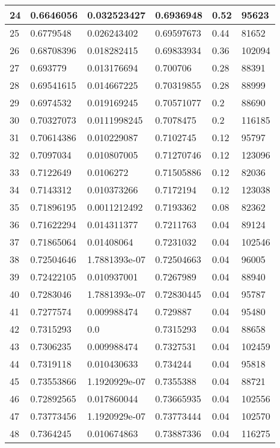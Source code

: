 \begin{longtable}{|l|l|l|l|l|l|}
24 & 0.6646056 & 0.032523427 & 0.6936948 & 0.52 & 95623 \\ \hline 
25 & 0.6779548 & 0.026243402 & 0.69597673 & 0.44 & 81652 \\ \hline 
26 & 0.68708396 & 0.018282415 & 0.69833934 & 0.36 & 102094 \\ \hline 
27 & 0.693779 & 0.013176694 & 0.700706 & 0.28 & 88391 \\ \hline 
28 & 0.69541615 & 0.014667225 & 0.70319855 & 0.28 & 88999 \\ \hline 
29 & 0.6974532 & 0.019169245 & 0.70571077 & 0.2 & 88690 \\ \hline 
30 & 0.70327073 & 0.0111998245 & 0.7078475 & 0.2 & 116185 \\ \hline 
31 & 0.70614386 & 0.010229087 & 0.7102745 & 0.12 & 95797 \\ \hline 
32 & 0.7097034 & 0.010807005 & 0.71270746 & 0.12 & 123096 \\ \hline 
33 & 0.7122649 & 0.0106272 & 0.71505886 & 0.12 & 82036 \\ \hline 
34 & 0.7143312 & 0.010373266 & 0.7172194 & 0.12 & 123038 \\ \hline 
35 & 0.71896195 & 0.0011212492 & 0.7193362 & 0.08 & 82362 \\ \hline 
36 & 0.71622294 & 0.014311377 & 0.7211763 & 0.04 & 89124 \\ \hline 
37 & 0.71865064 & 0.01408064 & 0.7231032 & 0.04 & 102546 \\ \hline 
38 & 0.72504646 & 1.7881393e-07 & 0.72504663 & 0.04 & 96005 \\ \hline 
39 & 0.72422105 & 0.010937001 & 0.7267989 & 0.04 & 88940 \\ \hline 
40 & 0.7283046 & 1.7881393e-07 & 0.72830445 & 0.04 & 95787 \\ \hline 
41 & 0.7277574 & 0.009988474 & 0.729887 & 0.04 & 95480 \\ \hline 
42 & 0.7315293 & 0.0 & 0.7315293 & 0.04 & 88658 \\ \hline 
43 & 0.7306235 & 0.009988474 & 0.7327531 & 0.04 & 102459 \\ \hline 
44 & 0.7319118 & 0.010430633 & 0.734244 & 0.04 & 95818 \\ \hline 
45 & 0.73553866 & 1.1920929e-07 & 0.7355388 & 0.04 & 88721 \\ \hline 
46 & 0.72892565 & 0.017860044 & 0.73665935 & 0.04 & 102556 \\ \hline 
47 & 0.73773456 & 1.1920929e-07 & 0.73773444 & 0.04 & 102570 \\ \hline 
48 & 0.7364245 & 0.010674863 & 0.73887336 & 0.04 & 116275 \\ \hline 

\end{longtable}
